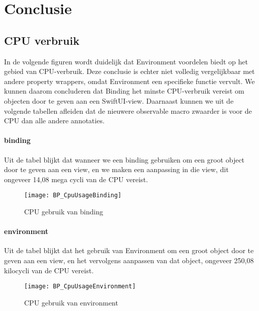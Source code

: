 
\chapter{Conclusie}%
\label{ch:conclusie}

\section{CPU verbruik}
In de volgende figuren wordt duidelijk dat Environment voordelen biedt op het gebied van CPU-verbruik. Deze conclusie is echter niet volledig vergelijkbaar met andere property wrappers, omdat Environment een specifieke functie vervult. We kunnen daarom concluderen dat Binding het minste CPU-verbruik vereist om objecten door te geven aan een SwiftUI-view. Daarnaast kunnen we uit de volgende tabellen afleiden dat de nieuwere observable macro zwaarder is voor de CPU dan alle andere annotaties.

\subsubsection{binding}
Uit de tabel blijkt dat wanneer we een binding gebruiken om een groot object door te geven aan een view, en we maken een aanpassing in die view, dit ongeveer 14,08 mega cycli van de CPU vereist.
\begin{figure}[htbp]
    \centering
    \texttt{[image: BP\_CpuUsageBinding]} 
    \caption{CPU gebruik van binding}
    \label{fig:cpuBinding}
\end{figure}

\subsubsection{environment}
Uit de tabel blijkt dat het gebruik van Environment om een groot object door te geven aan een view, en het vervolgens aanpassen van dat object, ongeveer 250,08 kilocycli van de CPU vereist.
\begin{figure}[htbp]
    \centering
    \texttt{[image: BP\_CpuUsageEnvironment]} 
    \caption{CPU gebruik van environment}
    \label{fig:cpuEnvironment}
\end{figure}

